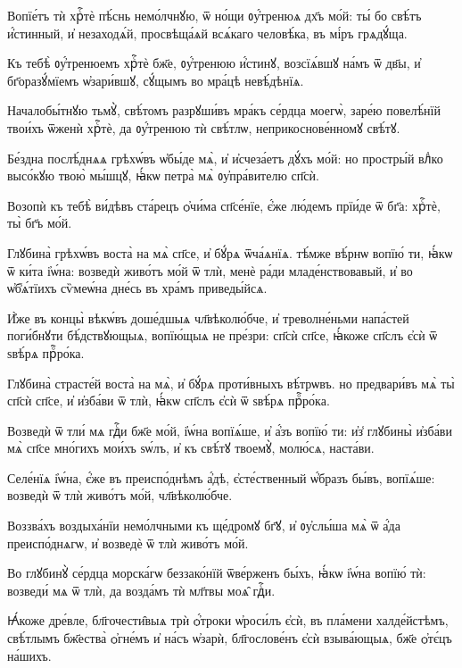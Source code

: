 \hKv Вопїе́тъ тѝ хрⷭ҇тѐ пѣ́снь немо́лчнꙋю, ѿ но́щи  ᲂу҆́тренюѧ дх҃ъ мо́й: ты́ бо свѣ́тъ и҆́стинный, и҆  незаходѧ́й, просвѣща́ѧй всѧ́каго человѣ́ка, въ мі́ръ  грѧдꙋ́ща.  

\hKv Къ тебѣ̀ ᲂу҆́тренюемъ хрⷭ҇тѐ бж҃е, ᲂу҆́тренюю и҆́стинꙋ,  возсїѧ́вшꙋ на́мъ ѿ дв҃ы, и҆ бг҃оразꙋ́мїемъ ѡ҆зари́вшꙋ,  сꙋ́щымъ во мра́цѣ невѣ́дѣнїѧ. 

\hKv Началобы́тнꙋю тьмꙋ̀, свѣ́томъ разрꙋши́въ мра́къ се́рдца  моегѡ̀, заре́ю повелѣ́нїй твои́хъ ѿженѝ хрⷭ҇тѐ, да  ᲂу҆́тренюю тѝ свѣ́тлѡ, неприкоснове́нномꙋ свѣ́тꙋ. 
%

\hKv Бе́здна послѣ́днѧѧ грѣхѡ́въ ѡ҆бы́де мѧ̀, и҆ и҆счеза́етъ  дꙋ́хъ мо́й: но простры́й влⷣко высо́кꙋю твою̀ мы́шцꙋ,  ꙗ҆́кѡ петра̀ мѧ̀ ᲂу҆пра́вителю сп҃сѝ. 
%

\hKv Возопѝ къ тебѣ̀ ви́дѣвъ ста́рецъ ѻ҆чи́ма  сп҃се́нїе, є҆́же лю́демъ прїи́де ѿ бг҃а: хрⷭ҇тѐ, ты̀  бг҃ъ мо́й. 

\hKv Глꙋбина̀ грѣхѡ́въ воста̀ на мѧ̀ сп҃се, и҆ бꙋ́рѧ ѿча́ѧнїѧ.  тѣ́мже вѣ́рнѡ вопїю́ ти,   ꙗ҆́кѡ ѿ ки́та і҆ѡ́на: возведѝ живо́тъ мо́й ѿ тлѝ,  менѐ ра́ди младе́нствовавый, и҆ во ѡ҆б̾ѧ́тїихъ сѷмеѡ́на  дне́сь въ хра́мъ приведы́йсѧ. 
%

\hKv И҆̀же въ концы̀ вѣкѡ́въ доше́дшыѧ  чл҃вѣколю́бче, и҆ треволне́ньми напа́стей поги́бнꙋти  бѣ́дствꙋющыѧ, вопїю́щыѧ не пре́зри: сп҃сѝ сп҃се, ꙗ҆́коже  сп҃слъ є҆сѝ ѿ ѕвѣ́рѧ прⷪ҇ро́ка. 
%

\hKv Глꙋбина̀ страсте́й воста̀ на мѧ̀, и҆ бꙋ́рѧ проти́вныхъ  вѣ́трѡвъ. но предвари́въ мѧ̀ ты̀ сп҃сѝ сп҃се, и҆ и҆зба́ви  ѿ тлѝ, ꙗ҆́кѡ сп҃слъ є҆сѝ ѿ ѕвѣ́рѧ прⷪ҇ро́ка. 

\hKv Возведѝ ѿ тли́ мѧ гдⷭ҇и бж҃е мо́й, і҆ѡ́на вопїѧ́ше, и҆  а҆́зъ вопїю́ ти: и҆з̾ глꙋбины̀ и҆зба́ви мѧ̀ сп҃се мно́гихъ  мои́хъ ѕѡ́лъ, и҆ къ свѣ́тꙋ твоемꙋ̀, молю́сѧ, наста́ви. 

\hKv Селе́нїѧ і҆ѡ́на, є҆́же въ преиспо́днѣмъ а҆́дѣ,  є҆сте́ственный ѡ҆́бразъ бы́въ, вопїѧ́ше: возведѝ ѿ тлѝ  живо́тъ мо́й, чл҃вѣколю́бче.  

\hKv Воззва́хъ воздыха́нїи немо́лчными къ ще́дромꙋ бг҃ꙋ, и҆  ᲂу҆слы́ша мѧ̀ ѿ а҆́да преиспо́днѧгѡ, и҆ возведѐ ѿ тлѝ  живо́тъ мо́й. 

\hKv Во глꙋбинꙋ̀ се́рдца морска́гѡ беззако́нїй ѿве́рженъ бы́хъ,  ꙗ҆́кѡ і҆ѡ́на вопїю́ тѝ: возведи́ мѧ ѿ тлѝ, да возда́мъ  тѝ мл҃твы моѧ̑ гдⷭ҇и. 
%

\hKv Ꙗ҆́коже дре́вле, бл҃гочести̑выѧ трѝ ѻ҆́троки ѡ҆роси́лъ  є҆сѝ, въ пла́мени халде́йстѣмъ, свѣ́тлымъ бж҃ества̀  ѻ҆гне́мъ и҆ на́съ ѡ҆зарѝ, бл҃гослове́нъ є҆сѝ взыва́ющыѧ,  бж҃е ѻ҆тє́цъ на́шихъ. 
%

